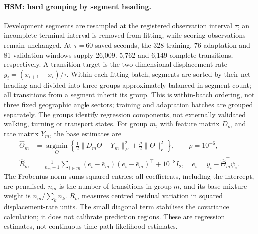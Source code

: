 \paragraph{HSM: hard grouping by segment heading.}
Development segments are resampled at the registered observation interval
$\tau$; an incomplete terminal interval is removed from fitting, while
scoring observations remain unchanged. At $\tau=60$ saved seconds, the
328 training, 76 adaptation and 81 validation windows supply 26,009,
5,762 and 6,149 complete transitions, respectively. A transition target
is the two-dimensional displacement rate $y_i=(x_{i+1}-x_i)/\tau$.
Within each fitting batch, segments are sorted by their net heading and
divided into three groups approximately balanced in segment count; all
transitions from a segment inherit its group. This is within-batch ordering,
not three fixed geographic angle sectors; training and adaptation batches
are grouped separately. The groups identify regression components, not externally
validated walking, turning or transport states. For group $m$, with feature
matrix $D_m$ and rate matrix $Y_m$, the base estimates are
\begin{align}
 \widehat\Theta_m&=\underset{\Theta}{\operatorname{argmin}}
 \left\{\tfrac12\|D_m\Theta-Y_m\|_F^2+
             \tfrac\rho2\|\Theta\|_F^2\right\},
 \qquad \rho=10^{-6},\label{eq:main-full-fit}\\
 \widehat R_m&=\frac1{n_m-1}\sum_{i\in m}
 (e_i-\bar e_m)(e_i-\bar e_m)^\top+10^{-8}I_2,
 \quad e_i=y_i-\widehat\Theta_m^\top\psi_i .
 \label{eq:main-full-residual}
\end{align}
The Frobenius norm sums squared entries; all coefficients, including the
intercept, are penalised. $n_m$ is the number of transitions in group $m$,
and its base mixture weight is $n_m/\sum_k n_k$. $R_m$ measures centred
residual variation in squared displacement-rate units. The small diagonal
term stabilises the covariance calculation; it does not calibrate prediction
regions. These are regression estimates, not continuous-time path-likelihood
estimates.

